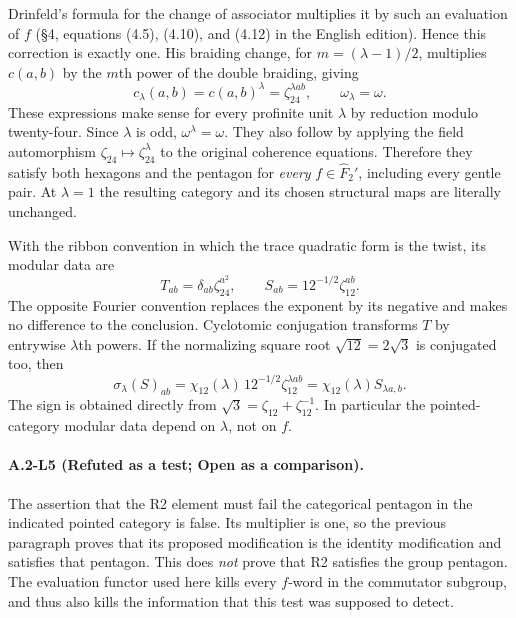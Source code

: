 Drinfeld's formula for the change of associator multiplies it by
such an evaluation of $f$ (\S4, equations (4.5), (4.10), and (4.12)
in the English edition).  Hence this correction is exactly one.
His braiding change, for $m=(\lambda-1)/2$, multiplies $c(a,b)$ by
the $m$th power of the double braiding, giving
\[
 c_\lambda(a,b)=c(a,b)^{\lambda}
 =\zeta_{24}^{\lambda ab},\qquad \omega_\lambda=\omega.
\]
These expressions make sense for every profinite unit $\lambda$
by reduction modulo twenty-four.  Since $\lambda$ is odd,
$\omega^\lambda=\omega$.  They also follow by applying the
field automorphism $\zeta_{24}\mapsto\zeta_{24}^{\lambda}$ to
the original coherence equations.  Therefore they satisfy both
hexagons and the pentagon for \emph{every} $f\in\widehat F_2'$,
including every gentle pair.  At $\lambda=1$ the resulting category
and its chosen structural maps are literally unchanged.

With the ribbon convention in which the trace quadratic form is
the twist, its modular data are
\[
 T_{ab}=\delta_{ab}\zeta_{24}^{a^2},\qquad
 S_{ab}=12^{-1/2}\zeta_{12}^{ab}.
\]
The opposite Fourier convention replaces the exponent by its
negative and makes no difference to the conclusion.  Cyclotomic
conjugation transforms $T$ by entrywise $\lambda$th powers.  If the
normalizing square root $\sqrt{12}=2\sqrt3$ is conjugated too,
then
\[
 \sigma_\lambda(S)_{ab}
 =\chi_{12}(\lambda)\,12^{-1/2}\zeta_{12}^{\lambda ab}
 =\chi_{12}(\lambda)S_{\lambda a,b}.
\]
The sign is obtained directly from
$\sqrt3=\zeta_{12}+\zeta_{12}^{-1}$.
In particular the pointed-category modular data depend on
$\lambda$, not on $f$.

\paragraph{A.2-L5 (Refuted as a test; Open as a comparison).}
The assertion that the R2 element must fail the categorical pentagon
in the indicated pointed category is false.  Its multiplier is one,
so the previous paragraph proves that its proposed modification is
the identity modification and satisfies that pentagon.
This does \emph{not} prove that R2 satisfies the group pentagon.
The evaluation functor used here kills every $f$-word in the
commutator subgroup, and thus also kills the information that this
test was supposed to detect.

